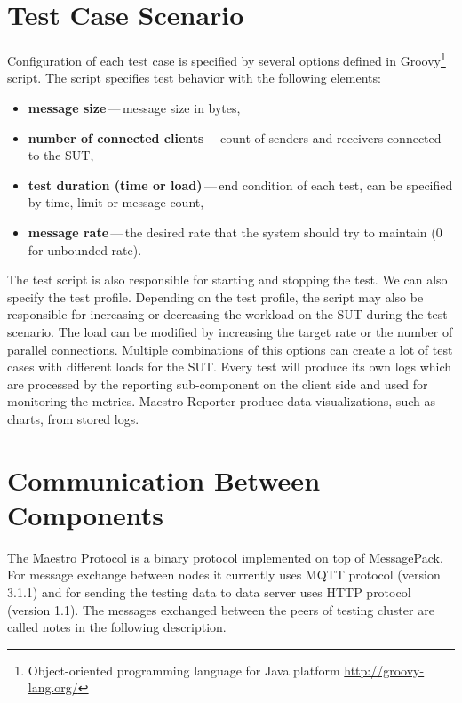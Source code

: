 \newpage

\section{Test Case Scenario}
Configuration of each test case is specified by several options defined in Groovy\footnote{Object-oriented programming language for Java platform \url{http://groovy-lang.org/}} script. The script specifies test behavior with the following elements:

\begin{itemize}
	\setlength\itemsep{0em}
	\item \textbf{message size}\,---\,message size in bytes,
	\item \textbf{number of connected clients}\,---\,count of senders and receivers connected to the SUT,
	\item \textbf{test duration (time or load)}\,---\,end condition of each test, can be specified by time, limit or message count,
	\item \textbf{message rate}\,---\,the desired rate that the system should try to maintain (0 for unbounded rate).
\end{itemize}

The test script is also responsible for starting and stopping the test. We can also specify the test profile. Depending on the test profile, the script may also be responsible for increasing or decreasing the workload on the SUT during the test scenario. The load can be modified by increasing the target rate or the number of parallel connections. Multiple combinations of this options can create a lot of test cases with different loads for the SUT. Every test will produce its own logs which are processed by the reporting sub-component on the client side and used for monitoring the metrics. Maestro Reporter produce data visualizations, such as charts, from stored logs.

\section{Communication Between Components}
\label{Communication Between Components}
The Maestro Protocol is a binary protocol implemented on top of MessagePack\footnotemark{}. For message exchange between nodes it currently uses MQTT protocol (version 3.1.1) and for sending the testing data to data server uses HTTP protocol (version 1.1). The messages exchanged between the peers of testing cluster are called notes in the following description.

